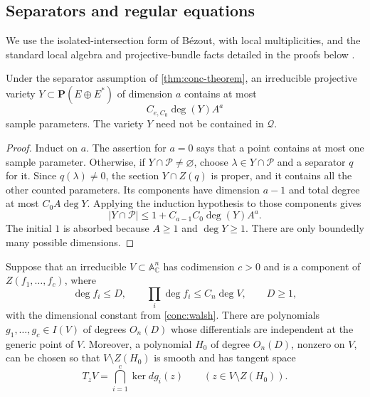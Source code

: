 

\subsection{Separators and regular equations}

We use the isolated-intersection form of B\'ezout, with local multiplicities, and the standard local algebra and projective-bundle facts detailed in the proofs below \cite{Ful,Hartshorne}.

\begin{lemma}
\label{lem:conc-separators}
Under the separator assumption of \cref{thm:conc-theorem}, an irreducible projective variety $Y\subset\mathbf{P}(E\oplus E^*)$ of dimension $a$ contains at most
\[
 C_{e,C_0}\deg(Y)A^a
\]
sample parameters.  The variety $Y$ need not be contained in $\mathcal{Q}$.
\end{lemma}

\begin{proof}
Induct on $a$.  The assertion for $a=0$ says that a point contains at most one sample parameter.  Otherwise, if $Y\cap\mathcal{P}\ne\varnothing$, choose $\lambda\in Y\cap\mathcal{P}$ and a separator $q$ for it.  Since $q(\lambda)\ne0$, the section $Y\cap Z(q)$ is proper, and it contains all the other counted parameters.  Its components have dimension $a-1$ and total degree at most $C_0A\deg Y$.  Applying the induction hypothesis to those components gives
\[
 |Y\cap\mathcal{P}|
 \leq 1+C_{a-1}C_0\deg(Y)A^a.
\]
The initial $1$ is absorbed because $A\geq1$ and $\deg Y\geq1$. There are only boundedly many possible dimensions.
\end{proof}

\begin{lemma}
\label{lem:conc-regularity}
Suppose that an irreducible $V\subset\mathbb{A}^n_{\mathbb{C}}$ has codimension $c>0$ and is a component of $Z(f_1,\ldots,f_c)$, where
\[
 \deg f_i\leq D,\qquad
 \prod_i\deg f_i\leq C_n\deg V,\qquad D\geq1,
\]
with the dimensional constant from \cref{conc:walsh}. There are polynomials $g_1,\ldots,g_c\in I(V)$ of degrees $O_n(D)$ whose differentials are independent at the generic point of $V$. Moreover, a polynomial $H_0$ of degree $O_n(D)$, nonzero on $V$, can be chosen so that $V\setminus Z(H_0)$ is smooth and has tangent space
\[
 T_zV=\bigcap_{i=1}^c\ker dg_i(z)
 \qquad(z\in V\setminus Z(H_0)).
\]
\end{lemma}

